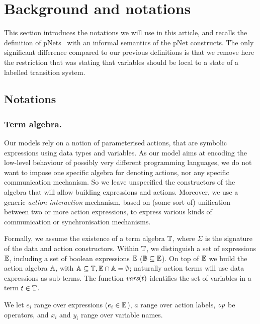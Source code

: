 \documentclass{lmcs}
\newcommand{\TODO}[1]{\textcolor{red}{\textbf{[TODO:#1]}}}
\begin{document}
\section{Background and notations}\label{sec:notations}
This section introduces the notations we will use in this article, and  recalls the definition of pNets~\cite{henrio:Forte2016} with an informal semantics  of the pNet constructs. The only significant difference compared to our previous definitions is that we remove here the restriction that was stating that variables should be local to a state of a labelled transition system.




\subsection{Notations}
\subsubsection*{Term algebra.}
Our models rely on a notion of parameterised actions, that are
symbolic expressions using data types and variables. As our model aims
at encoding the low-level behaviour of possibly very different
programming languages, we do not want to impose one specific algebra
for denoting actions, nor any specific communication mechanism. So we
leave unspecified the constructors of the algebra that will allow building
expressions and actions. Moreover, we use a generic {\em action interaction}
mechanism, based on (some sort of) unification between two or more action
expressions, to express various kinds of communication or
synchronisation mechanisms.


Formally, we assume the existence of a term algebra $\mathbb{T}$,
where $\Sigma$ is the signature of the data and action constructors. Within $\mathbb{T}$, we distinguish a set of
 expressions $\mathbb{E}$, including a set of boolean
expressions $\mathbb{E}$ ($\mathbb{B}\subseteq\mathbb{E}$). 
On top of $\mathbb{E}$ we build the action algebra
$\mathbb{A}$, with $\mathbb{A}\subseteq\mathbb{T},
\mathbb{E}\cap\mathbb{A}=\emptyset$;
naturally action terms will use data expressions as sub-terms.
The function
$\vars(t)$ identifies the set of variables in a term
$t\in\mathbb{T}$.

We let $e_i$ range over expressions ($e_i\in\mathbb{E}$), $a$
range over action labels, $\symb{op}$ be operators, and $x_i$ and $y_i$ range over
variable names. 
\end{document}
